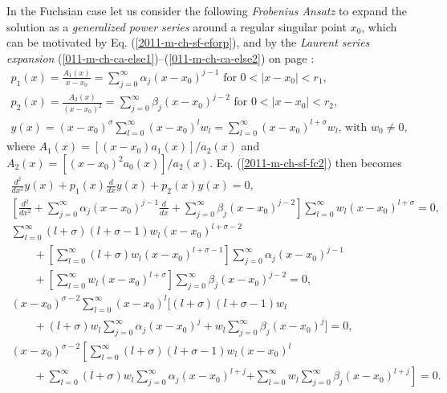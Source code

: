In the Fuchsian case let us consider the following {\it Frobenius Ansatz}
to expand the solution as a {\em generalized power series} around a regular singular point $x_0$,
which can be  motivated by Eq. (\ref{2011-m-ch-sf-eforp}), and by the {\em Laurent series expansion}
(\ref{011-m-ch-ca-else1})--(\ref{011-m-ch-ca-else2}) on
page \pageref{011-m-ch-ca-else1}:
\begin{equation}
\begin{split}
  p_1  (x)  = \frac{A_1(x)}{x-x_0}=\sum_{j=0}^\infty \alpha_j (x-x_0)^{j-1} \textrm{  for } 0 < \vert x-x_0 \vert < r_1,\\
 p_2 (x) = \frac{A_2(x)}{(x-x_0)^2}=\sum_{j=0}^\infty \beta_j (x-x_0)^{j-2} \textrm{  for } 0 < \vert x-x_0 \vert < r_2,\\
y(x)=  (x-x_0)^{\sigma} \sum_{l=0}^\infty  (x-x_0)^{l} w_l
=  \sum_{l=0}^\infty (x-x_0)^{l + \sigma} w_l \textrm{, with } w_0\neq 0
,
\end{split}
\label{2011-m-ch-sf-pss2}
\end{equation}
where $A_1(x)= [(x-x_0) a_1(x)]/a_2(x)$
and $A_2(x)= [(x-x_0)^2 a_0(x)]/a_2(x)$.
Eq. (\ref{2011-m-ch-sf-fc2})
then becomes
\begin{equation*}
\begin{split}
\frac{d^2}{dx^2}y(x) +   p_1  (x)    \frac{d}{dx}y(x)+    p_2  (x)   y(x)     =   0,    \\
\left[\frac{d^2}{dx^2}  + \sum_{j=0}^\infty \alpha_j (x-x_0)^{j-1}  \frac{d}{dx} + \sum_{j=0}^\infty \beta_j (x-x_0)^{j-2}\right]
\sum_{l=0}^\infty w_l (x-x_0)^{l + \sigma}     =   0,    \\
\sum_{l=0}^\infty ({l + \sigma})({l + \sigma-1}) w_l (x-x_0)^{l + \sigma -2}\qquad \qquad \\
\qquad + \left[  \sum_{l=0}^\infty ({l + \sigma}) w_l (x-x_0)^{l + \sigma -1}\right]  \sum_{j=0}^\infty \alpha_j (x-x_0)^{j-1} \qquad \qquad
\\
\qquad + \left[\sum_{l=0}^\infty w_l (x-x_0)^{l + \sigma}\right] \sum_{j=0}^\infty \beta_j (x-x_0)^{j-2}
    =   0,    \\
(x-x_0)^{\sigma-2}  \sum_{l=0}^\infty (x-x_0)^{l}
\Bigg[
({l + \sigma})({l + \sigma-1})   w_l  \qquad \qquad \\
\qquad + ({l + \sigma})   w_l    \sum_{j=0}^\infty \alpha_j (x-x_0)^{j}
+  w_l  \sum_{j=0}^\infty \beta_j (x-x_0)^{j}
\Bigg]
    =   0,
\\
(x-x_0)^{\sigma-2} \left[ \sum_{l=0}^\infty
({l + \sigma})({l + \sigma-1})   w_l (x-x_0)^{l}\right. \qquad \qquad \\
\qquad +  \sum_{l=0}^\infty ({l + \sigma})   w_l    \sum_{j=0}^\infty \alpha_j (x-x_0)^{l+j}
\left.
 +  \sum_{l=0}^\infty  w_l  \sum_{j=0}^\infty \beta_j (x-x_0)^{l+j}  \right]
    =   0.
\end{split}
\end{equation*}
